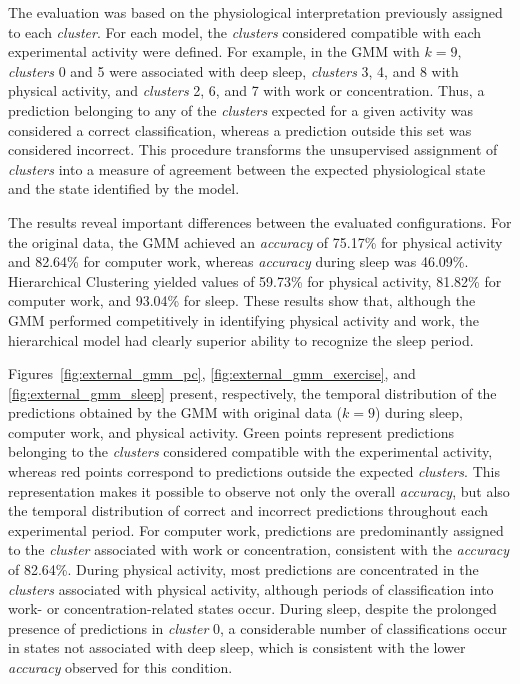 \documentclass[a4paper,fleqn]{cas-sc}
\begin{document}
The evaluation was based on the physiological interpretation previously assigned to each \textit{cluster}. For each model, the \textit{clusters} considered compatible with each experimental activity were defined. For example, in the GMM with $k=9$, \textit{clusters} 0 and 5 were associated with deep sleep, \textit{clusters} 3, 4, and 8 with physical activity, and \textit{clusters} 2, 6, and 7 with work or concentration. Thus, a prediction belonging to any of the \textit{clusters} expected for a given activity was considered a correct classification, whereas a prediction outside this set was considered incorrect. This procedure transforms the unsupervised assignment of \textit{clusters} into a measure of agreement between the expected physiological state and the state identified by the model.

The results reveal important differences between the evaluated configurations. For the original data, the GMM achieved an \textit{accuracy} of 75.17\% for physical activity and 82.64\% for computer work, whereas \textit{accuracy} during sleep was 46.09\%. Hierarchical Clustering yielded values of 59.73\% for physical activity, 81.82\% for computer work, and 93.04\% for sleep. These results show that, although the GMM performed competitively in identifying physical activity and work, the hierarchical model had clearly superior ability to recognize the sleep period.

Figures~\ref{fig:external_gmm_pc}, \ref{fig:external_gmm_exercise}, and \ref{fig:external_gmm_sleep} present, respectively, the temporal distribution of the predictions obtained by the GMM with original data ($k=9$) during sleep, computer work, and physical activity. Green points represent predictions belonging to the \textit{clusters} considered compatible with the experimental activity, whereas red points correspond to predictions outside the expected \textit{clusters}. This representation makes it possible to observe not only the overall \textit{accuracy}, but also the temporal distribution of correct and incorrect predictions throughout each experimental period. For computer work, predictions are predominantly assigned to the \textit{cluster} associated with work or concentration, consistent with the \textit{accuracy} of 82.64\%. During physical activity, most predictions are concentrated in the \textit{clusters} associated with physical activity, although periods of classification into work- or concentration-related states occur. During sleep, despite the prolonged presence of predictions in \textit{cluster} 0, a considerable number of classifications occur in states not associated with deep sleep, which is consistent with the lower \textit{accuracy} observed for this condition.
\end{document}
